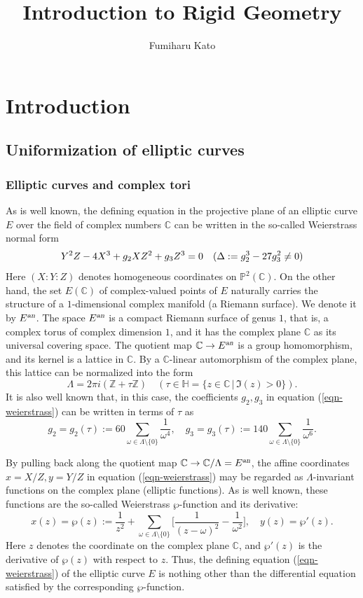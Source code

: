 \documentclass[a4paper,12pt, dvipdfmx]{jsbook}
\title{Introduction to Rigid Geometry}
\author{Fumiharu Kato}
\date{\relax}
\def\Z{\mathbb{Z}}
\def\C{\mathbb{C}}
\def\P{\mathbb{P}}
\def\an{\textsl{an}}
\theoremstyle{plain}
\theoremstyle{definition}
\newcounter{chushaku}
\begin{document}
\maketitle

\setcounter{chapter}{-1}
\setcounter{page}{0}
\setcounter{chushaku}{0}
\chapter{Introduction}\label{CH-INTRODUCTION}
\section{Uniformization of elliptic curves}\label{sec-introtatecurves}
\setcounter{equation}{0}
\subsection{Elliptic curves and complex tori}\label{sub-ellipticcurvescomplextori}
As is well known, the defining equation in the projective plane of an elliptic curve $E$ over the field of complex numbers $\C$ can be written in the so-called Weierstrass normal form
\begin{equation}\label{eqn-weierstrass}
Y^2Z-4X^3+g_2XZ^2+g_3Z^3=0\quad(\Delta:=g^3_2-27g^2_3\neq 0)\\
\end{equation}
Here $(X\colon\! Y\colon\! Z)$ denotes homogeneous coordinates on $\P^2(\C)$.
On the other hand, the set $E(\C)$ of complex-valued points of $E$ naturally carries the structure of a $1$-dimensional complex manifold (a Riemann surface).
We denote it by $E^{\an}$.
The space $E^{\an}$ is a compact Riemann surface of genus $1$, that is, a complex torus of complex dimension $1$, and it has the complex plane $\C$ as its universal covering space.
The quotient map $\C\rightarrow E^{\an}$ is a group homomorphism, and its kernel is a lattice in $\C$.
By a $\C$-linear automorphism of the complex plane, this lattice can be normalized into the form
$$
\Lambda=2\pi i(\Z+\tau\Z)\quad(\tau\in\mathbb{H}=\{z\in\C\,|\,\Im(z)>0\}).
$$
It is also well known that, in this case, the coefficients $g_2,g_3$ in equation (\ref{eqn-weierstrass}) can be written in terms of $\tau$ as
$$
g_2=g_2(\tau):=60\sum_{\omega\in\Lambda\setminus\{0\}}\frac{1}{\omega^4},\quad g_3=g_3(\tau):=140\sum_{\omega\in\Lambda\setminus\{0\}}\frac{1}{\omega^6}.
$$

By pulling back along the quotient map $\C\rightarrow\C/\Lambda=E^{\an}$, the affine coordinates $x=X/Z,y=Y/Z$ in equation (\ref{eqn-weierstrass}) may be regarded as $\Lambda$-invariant functions on the complex plane (elliptic functions).
As is well known, these functions are the so-called Weierstrass $\wp$-function and its derivative:
$$
x(z)=\wp(z):=\frac{1}{z^2}+\sum_{\omega\in\Lambda\setminus\{0\}}\bigg[\frac{1}{(z-\omega)^2}-\frac{1}{\omega^2}\bigg],\quad y(z)=\wp'(z).
$$
Here $z$ denotes the coordinate on the complex plane $\C$, and $\wp'(z)$ is the derivative of $\wp(z)$ with respect to $z$.
Thus, the defining equation (\ref{eqn-weierstrass}) of the elliptic curve $E$ is nothing other than the differential equation satisfied by the corresponding $\wp$-function.
\end{document}
